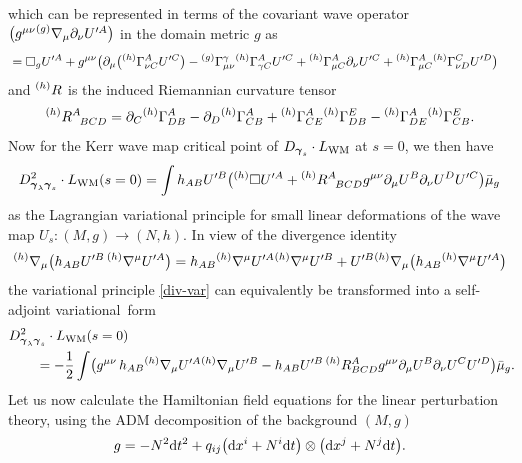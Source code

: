 \documentclass[pdftex]{sigma}
\def\ptl{\partial}%
\def\mbo#1{\boldsymbol{#1}}%
\def\grad{{\nabla}}%
\newcommand{\leftexp}[2]{{\vphantom{#2}}^{#1}{#2}}
\def\halb{\frac{1}{2}}%
\numberwithin{equation}{section}
\begin{document}
which can be represented in terms of the covariant wave operator $\bigl(g^{\mu \nu}\leftexp{(g)}{\grad}_{\mu} \ptl_\nu U'^A\bigr)$ in the domain metric $g$ as
\begin{align*}
&{}= \square_g U'^A + g^{\mu \nu} \bigl(\ptl_\mu \bigl(\leftexp{(h)}{\Gamma}^A_{\nu C} U'^C\bigr) - \leftexp{(g)}{\Gamma}^\gamma_{\mu \nu} \leftexp{(h)}{\Gamma}^A_{\gamma C} U'^C + \leftexp{(h)}{\Gamma}^A_{\mu C} \ptl_\nu U'^C+ \leftexp{(h)}{\Gamma}^A_{\mu C} \leftexp{(h)}{\Gamma}^C_{\nu D} U'^D \bigr)
\end{align*}
and $\leftexp{(h)}{R}$ is the induced Riemannian curvature tensor
\[
 \leftexp{(h)}{R}^A_{\,\,\,\,BCD} = \ptl_C\leftexp{(h)}{\Gamma}^A_{DB} - \ptl_D\leftexp{(h)}{\Gamma}^A_{CB} + \leftexp{(h)}{\Gamma}^A_{CE} \leftexp{(h)}{\Gamma}^E_{DB} - \leftexp{(h)}{\Gamma}^A_{DE}\leftexp{(h)}{\Gamma}^E_{CB}.
\]
Now for the Kerr wave map critical point of $D_{\mbo{\gamma}_s} \cdot L_{{\rm WM}}$ at $s=0$, we then have
\begin{align} \label{div-var}
D^2_{\mbo{\gamma}_\lambda \mbo{\gamma}_s} \cdot L_{{\rm WM}} (s=0) = \int h_{AB} U'^B \bigl(\leftexp{(h)}{\square} U'^A + \leftexp{(h)}{R}^A_{\,\,\,\,BCD} g^{\mu \nu} \ptl_\mu U^B \ptl_\nu U^D U'^C\bigr) \bar{\mu}_g
\end{align}
as the Lagrangian variational principle for small linear deformations of the wave map $U_s \colon (M, g)\allowbreak \to (N, h)$.
In view of the divergence identity
\begin{align*}
\leftexp{(h)}{\grad}_\mu \bigl(h_{AB} U'^B \, \leftexp{(h)}{\grad}^\mu U'^A\bigr)= h_{AB} \leftexp{(h)}{\grad}^\mu U'^A \leftexp{(h)}{\grad}^{\mu} U'^B +
U'^B \leftexp{(h)}{\grad}_{\mu} \bigl(h_{AB} \leftexp{(h)}{\grad}^\mu U'^A\bigr)
\end{align*}
the variational principle \eqref{div-var} can equivalently be transformed into a self-adjoint variational~form
\begin{align}
& D^2_{\mbo{\gamma}_\lambda \mbo{\gamma}_s} \cdot L_{{\rm WM}} (s=0) \notag\\
&\qquad{}= - \halb \int \bigl(g^{\mu \nu}\, h_{AB}\leftexp{(h)}{\grad}_\mu U'^A \leftexp{(h)}{\grad}_\mu U'^B - h_{AB} U'^B \, \leftexp{(h)}{R}^A_{BCD} g^{\mu \nu} \ptl_\mu U^B \ptl_\nu U^C U'^D \bigr) \bar{\mu}_g.\!\!\label{quad-var}
\end{align}
Let us now calculate the Hamiltonian field equations for the linear perturbation theory, using the ADM decomposition of the background $(M, g)$
\begin{align*}
g = -N^2 {\rm d}t^2 + q_{ij} \bigl({\rm d}x^i + N^i {\rm d}t\bigr) \otimes \bigl({\rm d}x^j + N^j {\rm d}t\bigr).
\end{align*}
\end{document}
